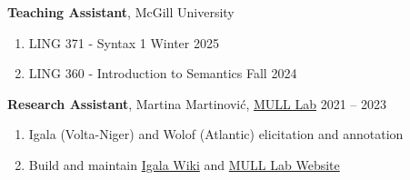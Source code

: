 \documentclass[margin,line]{resume}
\begin{document}
\begin{resume}
	\textbf{Teaching Assistant}, 
	McGill University
	\begin{enumerate}[-, leftmargin=1em, topsep=2pt]
		\item[] LING 371 - Syntax 1 \hfill Winter 2025
		\item[] LING 360 - Introduction to Semantics \hfill Fall 2024
	\end{enumerate}


	\textbf{Research Assistant}, Martina Martinović, \href{https://mull-lab.org/}{MULL Lab} \hfill 2021 -- 2023
	\begin{enumerate}[-, leftmargin=1em, topsep=2pt]
		\item[] Igala (Volta-Niger) and Wolof (Atlantic) elicitation and annotation
		\item[] Build and maintain \href{https://wiki.mull-lab.org/Igala/}{Igala Wiki} and \href{https://mull-lab.org/}{MULL Lab Website}%
	\end{enumerate}%

\end{resume}
\end{document}
